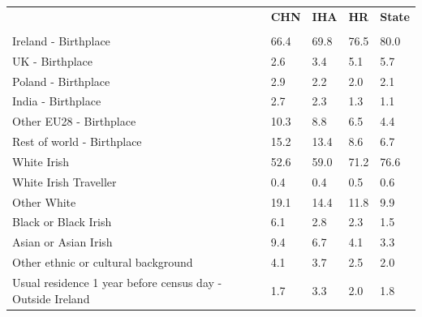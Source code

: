 \documentclass{article}
\begin{document}
\pagebreak
\begin{table}[h]	
\centering
		\begin{tabular}{KTTTT}
  \hline
& \textbf{CHN} & \textbf{IHA} & \textbf{HR}& \textbf{State}\\ 
  \hline
    \\ 
    \hline
Ireland - Birthplace & 66.4& 69.8& 76.5& 80.0\\
UK - Birthplace & 2.6& 3.4& 5.1& 5.7\\
Poland - Birthplace & 2.9& 2.2& 2.0& 2.1\\
India - Birthplace & 2.7& 2.3& 1.3& 1.1\\
Other EU28 - Birthplace & 10.3&  8.8&  6.5&  4.4\\
Rest of world - Birthplace & 15.2& 13.4&  8.6&  6.7\\
    \hline
White Irish & 52.6& 59.0& 71.2& 76.6\\
White Irish Traveller & 0.4& 0.4& 0.5& 0.6\\
Other White & 19.1& 14.4& 11.8&  9.9\\
Black or Black Irish & 6.1& 2.8& 2.3& 1.5\\
Asian or Asian Irish & 9.4& 6.7& 4.1& 3.3\\
Other ethnic or cultural background & 4.1& 3.7& 2.5& 2.0\\
    \hline
Usual residence 1 year before census day - Outside Ireland & 1.7& 3.3& 2.0& 1.8\\


\end{tabular}
\end{table}
\end{document}
